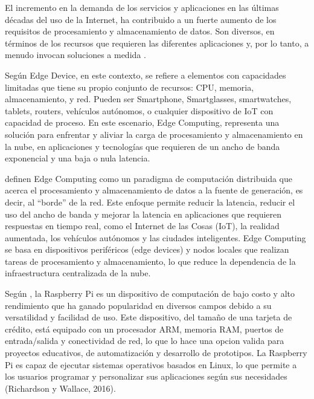 

El incremento en la demanda de los servicios y aplicaciones en las últimas décadas del uso de la Internet, ha contribuido a un fuerte aumento de los requisitos de procesamiento y almacenamiento de datos.  Son diversos, en términos de los recursos que requieren las diferentes aplicaciones y, por lo tanto, a menudo invocan soluciones a medida \cite{dolui_comparison_2017}.

Según \citeauthor{medina_edge_2019} \citeyear{medina_edge_2019} Edge Device, en este contexto, se refiere a elementos con capacidades limitadas que tiene su propio conjunto de recursos: CPU, memoria, almacenamiento, y red. Pueden ser Smartphone, Smartglasses, smartwatches, tablets, routers, vehículos autónomos, o cualquier dispositivo de IoT con capacidad de proceso. En este escenario, Edge Computing, representa una solución para enfrentar y aliviar la carga de procesamiento y almacenamiento en la nube, en aplicaciones y tecnologías que requieren de un ancho de banda exponencial y una baja o nula latencia.

\citeauthor{shi_edge_2016} \citeyear{shi_edge_2016} definen Edge Computing como un paradigma de computación distribuida que acerca el procesamiento y almacenamiento de datos a la fuente de generación, es decir, al ``borde'' de la red. Este enfoque permite reducir la latencia, reducir el uso del ancho de banda y mejorar la latencia  en aplicaciones que requieren respuestas en tiempo real, como el Internet de las Cosas (IoT), la realidad aumentada, los vehículos autónomos y las ciudades inteligentes. Edge Computing se basa en dispositivos periféricos (edge devices) y nodos locales que realizan tareas de procesamiento y almacenamiento, lo que reduce la dependencia de la infraestructura centralizada de la nube.



Según \citeauthor{richardson_getting_2016} \citeyear{richardson_getting_2016}, la Raspberry Pi es un dispositivo de computación de bajo costo y alto rendimiento que ha ganado popularidad en diversos campos debido a su versatilidad y facilidad de uso. Este dispositivo, del tamaño de una tarjeta de crédito, está equipado con un procesador ARM, memoria RAM, puertos de entrada/salida y conectividad de red, lo que lo hace una opcion valida para proyectos educativos, de automatización y desarrollo de prototipos. La Raspberry Pi es capaz de ejecutar sistemas operativos basados en Linux, lo que permite a los usuarios programar y personalizar sus aplicaciones según sus necesidades (Richardson y Wallace, 2016).

